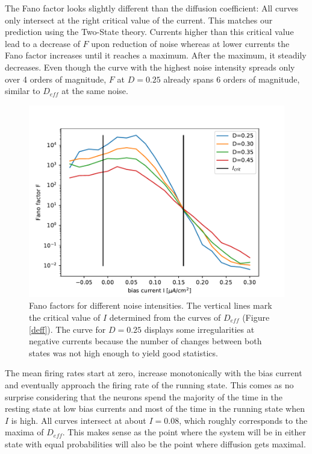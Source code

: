 \documentclass[12pt,a4paper]{article}
\begin{document}
The Fano factor looks slightly different than the diffusion coefficient: All curves only intersect at the right critical value of the current. This matches our prediction using the Two-State theory. Currents higher than this critical value lead to a decrease of $F$ upon reduction of noise whereas at lower currents the Fano factor increases until it reaches a maximum. After the maximum, it steadily decreases. Even though the curve with the highest noise intensity spreads only over 4 orders of magnitude, $F$ at $D=0.25$ already spans  6 orders of magnitude, similar to $D_{eff}$ at the same noise. 
\begin{figure}[H]
	\centering
	\includegraphics[scale=1]{fneur25critsprealfast16alcoarsewstfrealfast9acoarsetf.pdf}\caption{Fano factors for different noise intensities. The vertical lines mark the critical value of $I$ determined from the curves of $D_{eff}$ (Figure \ref{deff}). The curve for $D=0.25$ displays some irregularities at negative currents because the number of changes between both states was not high enough to yield good statistics.}
	\label{fano}
\end{figure}
The mean firing rates start at zero, increase monotonically with the bias current and eventually approach the firing rate of the running state. This comes as no surprise considering that the neurons spend the majority of the time in the resting state at low bias currents and most of the time in the running state when $I$ is high. All curves intersect at about $I=0.08$, which roughly corresponds to the maxima of $D_{eff}$. This makes sense as the point where the system will be in either state with equal probabilities will also be the point where diffusion gets maximal.
\end{document}
